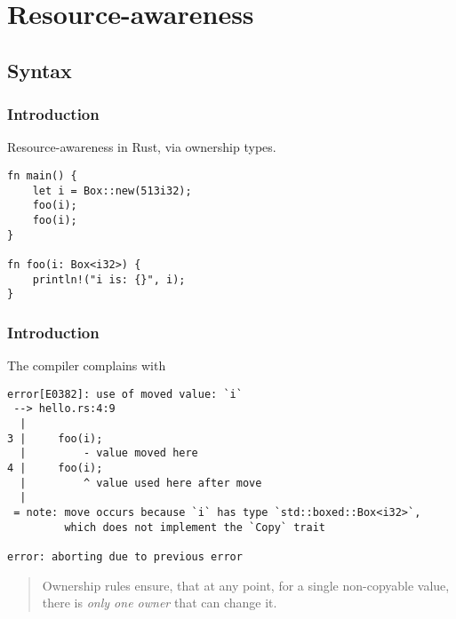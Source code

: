 \section{Resource-awareness}

\subsection{Syntax}

\begin{frame}[fragile]
  \frametitle{Introduction}

  Resource-awareness in Rust, via ownership types.
\begin{lstlisting}
fn main() {
    let i = Box::new(513i32);
    foo(i);
    foo(i);
}

fn foo(i: Box<i32>) {
    println!("i is: {}", i);
}
\end{lstlisting}

\end{frame}


\begin{frame}[fragile]
\frametitle{Introduction}
The compiler complains with
\begin{lstlisting}
error[E0382]: use of moved value: `i`
 --> hello.rs:4:9
  |
3 |     foo(i);
  |         - value moved here
4 |     foo(i);
  |         ^ value used here after move
  |
 = note: move occurs because `i` has type `std::boxed::Box<i32>`,
         which does not implement the `Copy` trait

error: aborting due to previous error
\end{lstlisting}

\pause

  \begin{quotation}
    Ownership rules ensure, that at any point, for a single
    non-copyable value, there is \emph{only one owner} that can change
    it.
  \end{quotation}

\end{frame}



